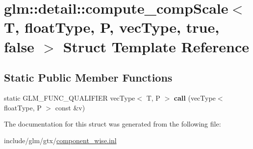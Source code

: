 \hypertarget{structglm_1_1detail_1_1compute__compScale_3_01T_00_01floatType_00_01P_00_01vecType_00_01true_00_01false_01_4}{}\section{glm\+:\+:detail\+:\+:compute\+\_\+comp\+Scale$<$ T, float\+Type, P, vec\+Type, true, false $>$ Struct Template Reference}
\label{structglm_1_1detail_1_1compute__compScale_3_01T_00_01floatType_00_01P_00_01vecType_00_01true_00_01false_01_4}
\subsection*{Static Public Member Functions}
\begin{DoxyCompactItemize}
\item 
\mbox{\label{structglm_1_1detail_1_1compute__compScale_3_01T_00_01floatType_00_01P_00_01vecType_00_01true_00_01false_01_4_a36a82cd119e92db7893e7067e28e9c30}} 
static G\+L\+M\+\_\+\+F\+U\+N\+C\+\_\+\+Q\+U\+A\+L\+I\+F\+I\+ER vec\+Type$<$ T, P $>$ {\bfseries call} (vec\+Type$<$ float\+Type, P $>$ const \&v)
\end{DoxyCompactItemize}


The documentation for this struct was generated from the following file\+:\begin{DoxyCompactItemize}
\item 
include/glm/gtx/\hyperlink{component__wise_8inl}{component\+\_\+wise.\+inl}\end{DoxyCompactItemize}
